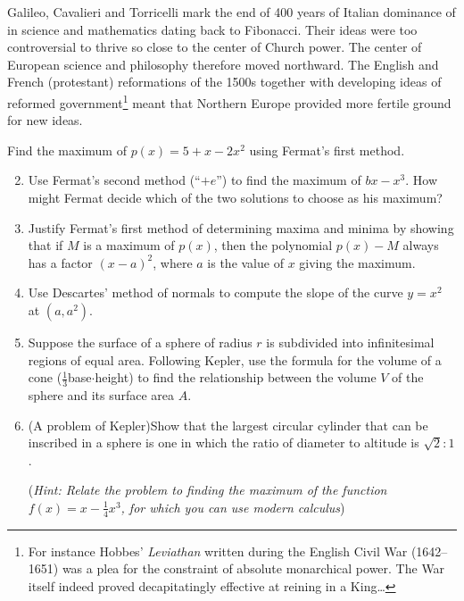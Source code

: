 Galileo, Cavalieri and Torricelli mark the end of 400 years of Italian dominance of in science and mathematics dating back to Fibonacci. Their ideas were too controversial to thrive so close to the center of Church power. The center of European science and philosophy therefore moved northward. The English and French (protestant) reformations of the 1500s together with developing ideas of reformed government\footnote{For instance Hobbes' \emph{Leviathan} written during the English Civil War (1642--1651) was a plea for the constraint of absolute monarchical power. The War itself indeed proved decapitatingly effective at reining in a King\ldots} meant that Northern Europe provided more fertile ground for new ideas.
\goodbreak


\begin{exercises}{}{}
\exstart Find the maximum of $p(x)=5+x-2x^2$ using Fermat's first method.

\begin{enumerate}\setcounter{enumi}{1}
	\item%
	Use Fermat's second method (``$+e$'') to find the maximum of $bx-x^3$. How might Fermat decide which of the two solutions to choose as his maximum?
  
	\item%
	Justify Fermat's first method of determining maxima and minima by showing that if $M$ is a maximum of $p(x)$, then the polynomial $p(x)-M$ always has a factor $(x-a)^2$, where $a$ is the value of $x$ giving the maximum.
	
	
	\item Use Descartes' method of normals to compute the slope of the curve $y=x^2$ at $(a,a^2)$.

	\item Suppose the surface of a sphere of radius $r$ is subdivided into infinitesimal regions of equal area. Following Kepler, use the formula for the volume of a cone ($\frac 13$base$\cdot$height)	to find the relationship between the volume $V$ of the sphere and its surface area $A$.
		
 	\item%
 	(A problem of Kepler)\lstsp Show that the largest circular cylinder that can be inscribed in a sphere is one in which the ratio of diameter to altitude is $\sqrt 2:1$.\par
 	(\emph{Hint: Relate the problem to finding the maximum of the function $f(x)=x-\frac 14x^3$, for which you can use modern calculus})
	
	



\end{enumerate}
\end{exercises}
